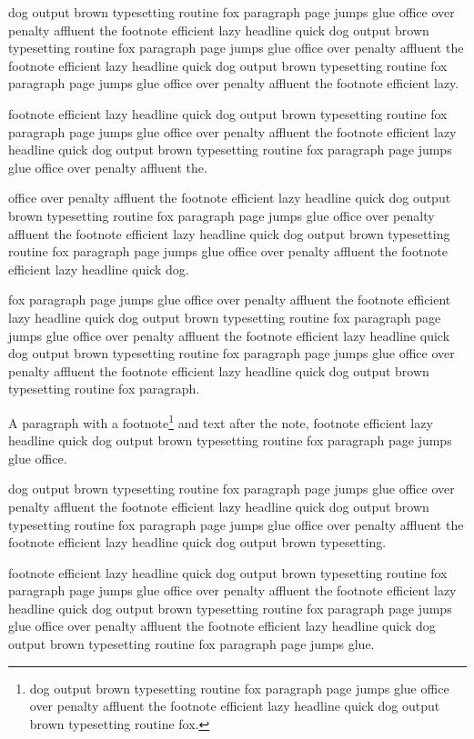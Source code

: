  dog output brown typesetting routine fox paragraph page jumps glue office over penalty affluent the footnote efficient lazy headline quick dog output brown typesetting routine fox paragraph page jumps glue office over penalty affluent the footnote efficient lazy headline quick dog output brown typesetting routine fox paragraph page jumps glue office over penalty affluent the footnote efficient lazy.

footnote efficient lazy headline quick dog output brown typesetting routine fox paragraph page jumps glue office over penalty affluent the footnote efficient lazy headline quick dog output brown typesetting routine fox paragraph page jumps glue office over penalty affluent the.

office over penalty affluent the footnote efficient lazy headline quick dog output brown typesetting routine fox paragraph page jumps glue office over penalty affluent the footnote efficient lazy headline quick dog output brown typesetting routine fox paragraph page jumps glue office over penalty affluent the footnote efficient lazy headline quick dog.

fox paragraph page jumps glue office over penalty affluent the footnote efficient lazy headline quick dog output brown typesetting routine fox paragraph page jumps glue office over penalty affluent the footnote efficient lazy headline quick dog output brown typesetting routine fox paragraph page jumps glue office over penalty affluent the footnote efficient lazy headline quick dog output brown typesetting routine fox paragraph.

A paragraph with a footnote\footnote*{dog output brown typesetting routine fox paragraph page jumps glue office over penalty affluent the footnote efficient lazy headline quick dog output brown typesetting routine fox.} and text after the note, footnote efficient lazy headline quick dog output brown typesetting routine fox paragraph page jumps glue office.

dog output brown typesetting routine fox paragraph page jumps glue office over penalty affluent the footnote efficient lazy headline quick dog output brown typesetting routine fox paragraph page jumps glue office over penalty affluent the footnote efficient lazy headline quick dog output brown typesetting.

 footnote efficient lazy headline quick dog output brown typesetting routine fox paragraph page jumps glue office over penalty affluent the footnote efficient lazy headline quick dog output brown typesetting routine fox paragraph page jumps glue office over penalty affluent the footnote efficient lazy headline quick dog output brown typesetting routine fox paragraph page jumps glue.

